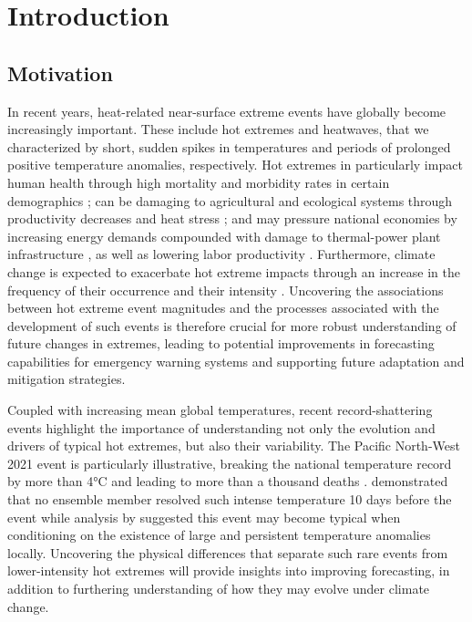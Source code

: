 \documentclass[11pt,a4paper,twoside,openright]{report}
\theoremstyle{definition}
\begin{document}
\chapter{Introduction}\label{introduction}

\section{Motivation}\label{motivation}

In recent years, heat-related near-surface extreme events have globally become increasingly important. These include hot extremes and heatwaves, that we characterized by short, sudden spikes in temperatures and periods of prolonged positive temperature anomalies, respectively. Hot extremes in particularly impact human health through high mortality and morbidity rates in certain demographics \citep{medina-ramon_temperature_2007,oudin_astrom_heat_2011,green_impact_2019,ebi_hot_2021}; can be damaging to agricultural and ecological systems through productivity decreases and heat stress \citep{teixeira_global_2013,gourdji_global_2013,vogel_effects_2019}; and may pressure national economies by increasing energy demands \citep{perera_quantifying_2020} compounded with damage to thermal-power plant infrastructure \citep{entriken_impacts_2012}, as well as lowering labor productivity \citep{garcia-leon_current_2021}. Furthermore, climate change is expected to exacerbate hot extreme impacts through an increase in the frequency of their occurrence and their intensity \citep{slater_substantial_2021,fischer_increasing_2021,thompson_2021_2022}. Uncovering the associations between hot extreme event magnitudes and the processes associated with the development of such events is therefore crucial for more robust understanding of future changes in extremes, leading to potential improvements in forecasting capabilities for emergency warning systems and supporting future adaptation and mitigation strategies.

Coupled with increasing mean global temperatures, recent record-shattering events highlight the importance of understanding not only the evolution and drivers of typical hot extremes, but also their variability. The Pacific North-West 2021 event is particularly illustrative, breaking the national temperature record by more than 4°C and leading to more than a thousand deaths \citep{white_unprecedented_2023}. \cite{lin_2021_2022} demonstrated that no ensemble member resolved such intense temperature 10 days before the event while analysis by \cite{lucarini_typicality_2023} suggested this event may become typical when conditioning on the existence of large and persistent temperature anomalies locally. Uncovering the physical differences that separate such rare events from lower-intensity hot extremes will provide insights into improving forecasting, in addition to furthering understanding of how they may evolve under climate change.
\end{document}
